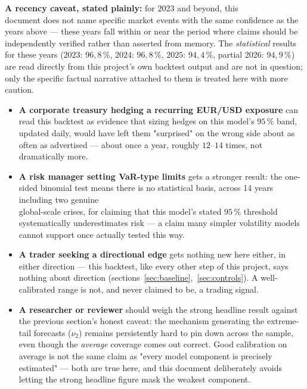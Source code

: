 \documentclass[12pt,a4paper]{article}
\begin{document}
	\vspace{0.3cm}
	
	\begin{limitbox}
		\textbf{A recency caveat, stated plainly:} for 2023
		and beyond, this \\document does not name specific market
		events with the same confidence as the years above ---
		these years fall within or near the period where claims
		should be independently verified rather than
		asserted from memory. The \emph{statistical} results for
		these years ($2023$: $96{,}8\,\%$, $2024$: $96{,}8\,\%$, $2025$: $94{,}4\,\%$,
		partial 2026: $94{,}9\,\%$) are read directly from this
		project's own backtest output and are not in question; only the
		specific factual narrative attached to them is treated
		here with more caution.
	\end{limitbox}
	
	\newpage
	
	\begin{econbox}
		\begin{itemize}
			\item \textbf{A corporate treasury hedging a recurring
				EUR/USD exposure} can read this backtest as evidence that
			sizing hedges on this model's $95\,\%$ band, updated
			daily, would have left them "surprised" on
			the wrong side about as often as advertised --- about
			once a year, roughly $12$--$14$ times, not dramatically more.
			\item \textbf{A risk manager setting VaR-type limits}
			gets a stronger result: the one-sided binomial test
			means there is no statistical basis, across
			14 years including two genuine \\global-scale crises, for
			claiming that this model's stated $95\,\%$ threshold
			systematically underestimates risk --- a claim many
			simpler volatility models cannot support once
			actually tested this way.
			\item \textbf{A trader seeking a directional edge} gets
			nothing new here either, in either direction --- this
			backtest, like every other step of this project, says nothing about
			direction (sections~\ref{sec:baseline},~\ref{sec:controls}). A
			well-calibrated range is not, and never claimed to
			be, a trading signal.
			\item \textbf{A researcher or reviewer} should weigh the
			strong headline result against the previous section's honest
			caveat: the mechanism generating the extreme-tail
			forecasts ($\nu_2$) remains persistently hard to
			pin down across the sample, even though the
			\emph{average} coverage comes out correct. Good
			calibration on average is not the same claim as
			"every model component is precisely estimated" ---
			both are true here, and this document deliberately avoids
			letting the strong headline figure mask the
			weakest component.
		\end{itemize}
	\end{econbox}
	
\end{document}
